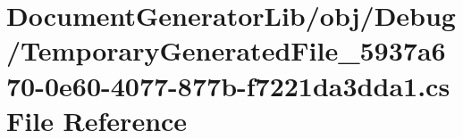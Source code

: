 \hypertarget{_document_generator_lib_2obj_2_debug_2_temporary_generated_file__5937a670-0e60-4077-877b-f7221da3dda1_8cs}{\section{Document\+Generator\+Lib/obj/\+Debug/\+Temporary\+Generated\+File\+\_\+5937a670-\/0e60-\/4077-\/877b-\/f7221da3dda1.cs File Reference}
\label{_document_generator_lib_2obj_2_debug_2_temporary_generated_file__5937a670-0e60-4077-877b-f7221da3dda1_8cs}
}
